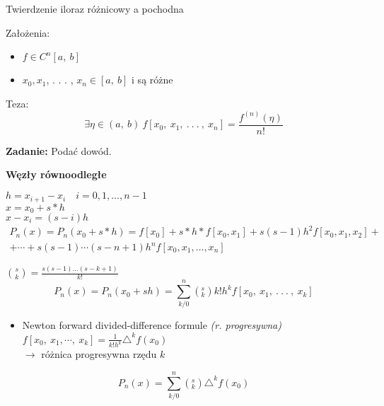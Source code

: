 \begin{frame}

\begin{block}
{Twierdzenie iloraz różnicowy a pochodna}

Założenia:
\begin{itemize}
\item $f\in C^{n}[a,\ b]$
\item $x_{0}, x_{1}$, . . . , $x_{n}\in[a,\ b] $ i są różne
\end{itemize}

Teza:
$$
\exists\eta\in(a,\ b)\ f[x_{0},\ x_{1},\ .\ .\ .\ ,\ x_{n}]=\frac{f^{(n)}(\eta)}{n!}
$$
\end{block}
\vspace{5mm}

\textbf{Zadanie:} Podać dowód.
\end{frame}

\begin{frame}
\textbf{Węzły równoodległe}

$h=x_{i+1}-x_{i} \quad i=0, 1, ..., n-1$ \\
$x=x_{0}+s*h$ \\
$x-x_{i}=(s-i)h$ \\

\begin{equation*} \begin{split} P_{n}(x)=P_{n}(x_{0}+s*h) = f[x_{0}]+s*h*f[x_{0}, x_{1}]+s(s - 1)h^{2}f[x_{0},x_{1},x_{2}]+ \\
+ \cdots +s(s-1)\cdots(s-n+1)h^{n}f[x_{0},x_{1},\dots ,x_{n}] \end{split} \end{equation*}

$\binom{s}{k}=\displaystyle \frac{s(s-1)\ldots(s-k+1)}{k!}$
$$
P_{n}(x)=P_{n}(x_{0}+sh)=\sum_{k/0}^{n}(_{k}^{s})k!h^{k}f[x_{0},\ x_{1},\ .\ .\ .\ ,\ x_{k}]
$$
\end{frame}

\begin{frame}
\begin{itemize}
\item Newton forward divided-difference formule {\it (r. progresywna)} \\
\vspace{2mm}
$f[x_{0},\displaystyle \ x_{1},\cdots,\ x_{k}]=\frac{1}{k!h^{k}}\triangle^{k}f(x_{0})$ \\
\vspace{3mm}
$\rightarrow$ różnica progresywna rzędu $k$
\end{itemize}

$$P_{n}(x)=\displaystyle \sum_{k/0}^{n}(_{k}^{s})\triangle^{k}f(x_{0})$$
\end{frame}
